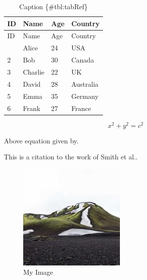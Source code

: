 \documentclass[
  12pt,
  a4paper,
  ]{report}
\begin{document}
\begin{center}
\label{GraphRef}
\end{center}

\begin{longtable}[]{@{}llll@{}}
\caption{Caption \{\#tbl:tabRef\}}\tabularnewline
\toprule\noalign{}
ID & Name & Age & Country \\
\midrule\noalign{}
\endfirsthead
\toprule\noalign{}
ID & Name & Age & Country \\
\midrule\noalign{}
\endhead
\bottomrule\noalign{}
\endlastfoot
1 & Alice & 24 & USA \\
2 & Bob & 30 & Canada \\
3 & Charlie & 22 & UK \\
4 & David & 28 & Australia \\
5 & Emma & 35 & Germany \\
6 & Frank & 27 & France \\
\end{longtable}

\[ x^2 + y^2 = c^2 \]

Above equation given by.\autocite{Einstein1905}

This is a citation to the work of Smith et al..\autocite{smith2021}

\begin{figure}
\centering
\includegraphics{./resources/img.jpg}
\caption{My Image}\label{fig:imgRef}
\end{figure}
\printbibliography
\end{document}
